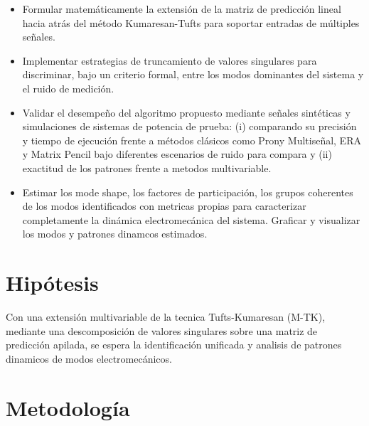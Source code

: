 \begin{itemize}

\item Formular matemáticamente la extensión de la matriz de predicción lineal hacia atrás del método 
Kumaresan-Tufts para soportar entradas de múltiples señales.
\item Implementar estrategias de truncamiento de valores singulares para discriminar, bajo un criterio 
formal, entre los modos dominantes del sistema y el ruido de medición.
\item Validar el desempeño del algoritmo propuesto mediante señales sintéticas y simulaciones de 
sistemas de potencia de prueba: (i) comparando su precisión y tiempo de ejecución frente a métodos clásicos 
como Prony Multiseñal, ERA y Matrix Pencil bajo diferentes escenarios de ruido para compara y (ii) exactitud de 
los patrones frente a metodos multivariable.
\item Estimar los mode shape, los factores de participación, los grupos coherentes de los modos identificados 
con metricas propias para caracterizar completamente la dinámica electromecánica del sistema. Graficar y 
visualizar los modos y patrones dinamcos estimados.

\end{itemize}

\section{Hipótesis}

Con una extensión multivariable de la tecnica Tufts-Kumaresan (M-TK), mediante una descomposición de 
valores singulares sobre una matriz de predicción apilada, se espera la identificación unificada y analisis de 
patrones dinamicos de modos electromecánicos.

\section{Metodología}

